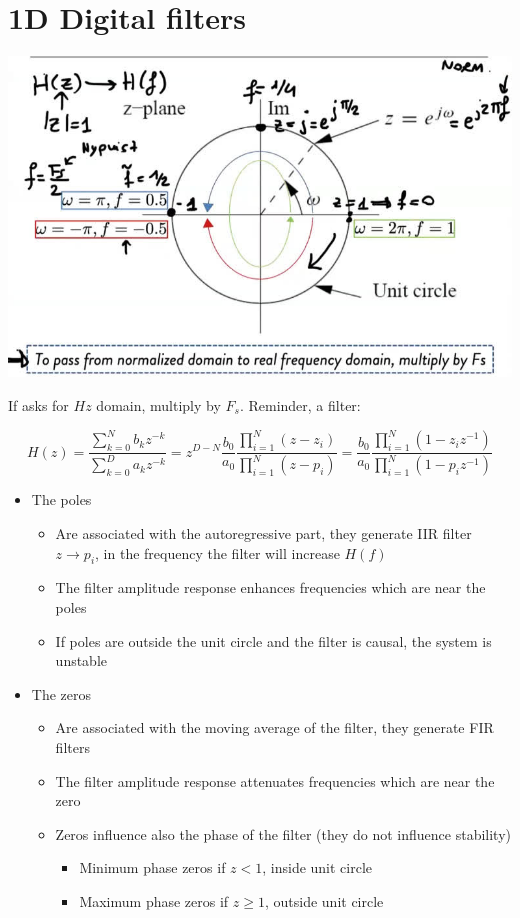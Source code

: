 
\section{1D Digital filters}
\begin{center}
    \includegraphics[width=1\textwidth]{images/zero_pole.png}
\end{center}
If asks for $Hz$ domain, multiply by $F_s$. Reminder, a filter:
\begin{LARGE}    
    $$
    H(z)=\frac{
        \sum_{k=0}^Nb_kz^{-k}
    }{\sum_{k=0}^Da_kz^{-k}}=
    z^{D-N}\frac{b_0}{a_0}\frac{
        \prod_{i=1}^N(z-z_i)
    }{\prod_{i=1}^N(z-p_i)}=
    \frac{b_0}{a_0}\frac{
        \prod_{i=1}^N(1-z_iz^{-1})
    }{\prod_{i=1}^N(1-p_iz^{-1})}
    $$
\end{LARGE}
\begin{itemize}
    \item The poles
    \begin{itemize}
        \item Are associated with the autoregressive part, they generate IIR filter $z\rightarrow p_i$, in the frequency the filter will increase $H(f)$
        \item The filter amplitude response enhances frequencies which are near the poles
        \item If poles are outside the unit circle and the filter is causal, the system is unstable
    \end{itemize}
    \item The zeros
    \begin{itemize}
        \item Are associated with the moving average of the filter, they generate FIR filters
        \item The filter amplitude response attenuates frequencies which are near the zero
        \item Zeros influence also the phase of the filter (they do not influence stability)
        \begin{itemize}
            \item Minimum phase zeros if $z<1$, inside unit circle
            \item Maximum phase zeros if $z\geq 1$, outside unit circle
        \end{itemize}
    \end{itemize}
\end{itemize}


